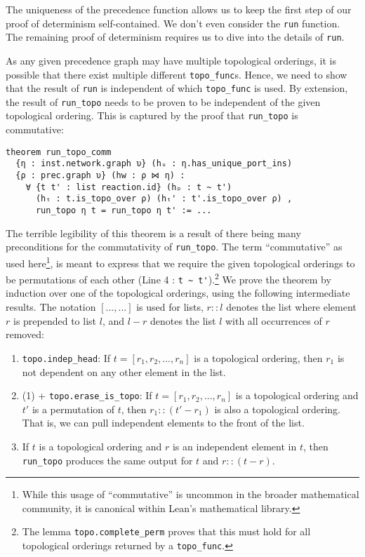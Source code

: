 The uniqueness of the precedence function allows us to keep the first step of our proof of determinism self-contained.
We don't even consider the \lstinline{run} function.  
The remaining proof of determinism requires us to dive into the details of \lstinline{run}.

As any given precedence graph may have multiple topological orderings, it is possible that there exist multiple different \lstinline{topo_func}s.
Hence, we need to show that the result of \lstinline{run} is independent of which \lstinline{topo_func} is used.
By extension, the result of \lstinline{run_topo} needs to be proven to be independent of the given topological ordering.
This is captured by the proof that \lstinline{run_topo} is commutative:

\lstset{numbers=left, xleftmargin=2em}
\begin{lstlisting}
theorem run_topo_comm 
  {η : inst.network.graph υ} (hᵤ : η.has_unique_port_ins) 
  {ρ : prec.graph υ} (hw : ρ ⋈ η) :
    ∀ {t t' : list reaction.id} (hₚ : t ~ t')
      (hₜ : t.is_topo_over ρ) (hₜ' : t'.is_topo_over ρ) , 
      run_topo η t = run_topo η t' := ...
\end{lstlisting}
\lstset{numbers=none, xleftmargin=0em}

\noindent The terrible legibility of this theorem is a result of there being many preconditions for the commutativity of \lstinline{run_topo}.
The term ``commutative'' as used here\footnote{While this usage of ``commutative'' is uncommon in the broader mathematical community, it is canonical within Lean's mathematical library.}, is meant to express that we require the given topological orderings to be permutations of each other (Line 4 : \lstinline{t ~ t'}).\footnote{
    The lemma \lstinline{topo.complete_perm} proves that this must hold for all topological orderings returned by a \lstinline{topo_func}.
}
We prove the theorem by induction over one of the topological orderings, using the following intermediate results.
The notation $[..., ...]$ is used for lists, $r :: l$ denotes the list where element $r$ is prepended to list $l$, and $l - r$ denotes the list $l$ with all occurrences of $r$ removed:

\begin{enumerate}
    \item \lstinline{topo.indep_head}: If $t = [r_1, r_2, ..., r_n]$ is a topological ordering, then $r_1$ is not dependent on any other element in the list.
    \item (1) + \lstinline{topo.erase_is_topo}: If $t = [r_1, r_2, ..., r_n]$ is a topological ordering and $t'$ is a permutation of $t$, then $r_1 :: (t' - r_1)$ is also a topological ordering.
    That is, we can pull independent elements to the front of the list.
    \item If $t$ is a topological ordering and $r$ is an independent element in $t$, then \lstinline{run_topo} produces the same output for $t$ and $r :: (t - r)$.
\end{enumerate}

